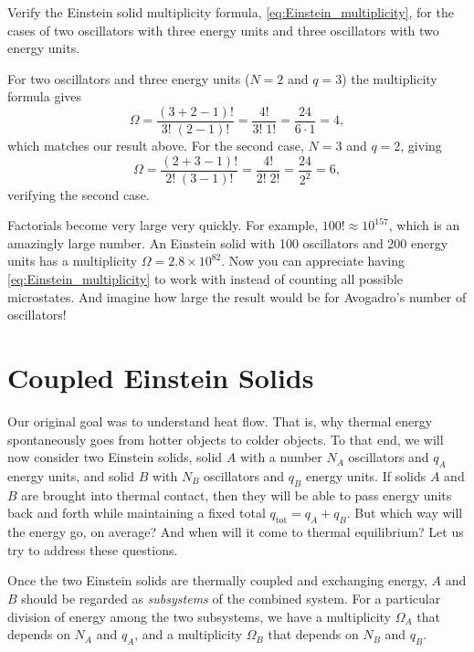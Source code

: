 \begin{example}
Verify the Einstein solid multiplicity formula,
\eqref{eq:Einstein_multiplicity}, for the cases of two oscillators
with three energy units and three oscillators with two energy units.


\solution
For two oscillators and three energy units ($N=2$ and $q=3$) the
multiplicity formula gives
\begin{equation}
\Omega = \frac{(3+2-1)!}{3!\;(2-1)!} = \frac{4!}{3!\;1!} =
\frac{24}{6\cdot 1} = 4,
\end{equation}
which matches our result above.  For the second case, $N=3$ and $q=2$,
giving
\begin{equation}
\Omega = \frac{(2+3-1)!}{2!\;(3-1)!} = \frac{4!}{2!\;2!} = \frac{24}{2^2}
= 6,
\end{equation}
verifying the second case.
\end{example}

Factorials become very large very quickly.  For example, $100!\approx
10^{157}$, which is an amazingly large number.  An Einstein solid with
100 oscillators and 200 energy units has a multiplicity $\Omega =
2.8\times 10^{82}$.  Now you can appreciate having
\eqref{eq:Einstein_multiplicity} to work with instead of counting
all possible microstates.  And imagine how large the result would be
for Avogadro's number of oscillators!

\section{Coupled Einstein Solids}

Our original goal was to understand heat flow.  That is, why thermal
energy spontaneously goes from hotter objects to colder objects.  To
that end, we will now consider two Einstein solids, solid $A$ with a
number $N_A$ oscillators and $q_A$ energy units, and solid $B$ with
$N_B$ oscillators and $q_B$ energy units.  If solids $A$ and $B$ are
brought into thermal contact, then they will be able to pass energy
units back and forth while maintaining a fixed total
$q_\text{tot}=q_A+q_B$.  But which way will the energy go, on average?  And
when will it come to thermal equilibrium?  Let us try to address these
questions. 

Once the two Einstein solids are thermally coupled and exchanging
energy, $A$ and $B$ should be regarded as \textit{subsystems} of the
combined system.  For a particular division of energy among the two
subsystems, we have a multiplicity $\Omega_A$ that depends on $N_A$
and $q_A$, and a multiplicity $\Omega_B$ that depends on $N_B$ and
$q_B$.  

